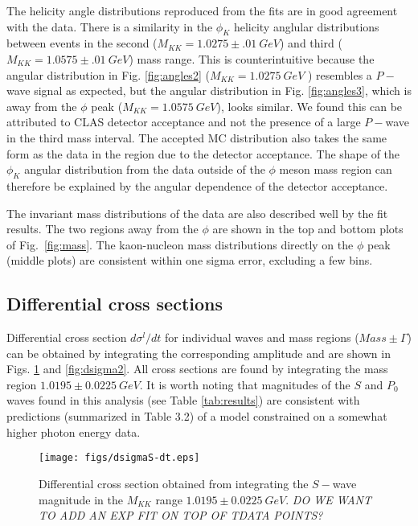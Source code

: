 \documentclass[twocolumn,superscriptaddress,prd]{revtex4}
\begin{document}
The helicity angle distributions reproduced from the fits are in good agreement with the data.
There is a similarity in the $\phi_{K}$ helicity anglular distributions between events in the second ($M_{KK} = 1.0275 \pm .01 \ GeV$) and third ($M_{KK} = 1.0575 \pm .01 \ GeV$) mass range. This is counterintuitive because the angular distribution in Fig. \ref{fig:angles2} ($M_{KK} = 1.0275 \ GeV$ ) resembles
a $P-$wave signal as expected, but the angular distribution in Fig.
\ref{fig:angles3}, which is away from the $\phi$ peak ($M_{KK} = 1.0575 \ GeV$), looks similar. We found this can be attributed to CLAS detector acceptance and not the presence of a large $P-$wave in the third mass interval. The accepted MC distribution also takes the same form as the data in the region due to the detector acceptance. The shape of the $\phi_{K}$ angular distribution from the data outside of the $\phi$ meson mass region can therefore be explained by the angular dependence of the detector acceptance.

The invariant mass distributions of the data are also described well by the fit results. The two regions away from the $\phi$ are shown in the top and bottom plots of  Fig.~\ref{fig:mass}. The kaon-nucleon mass distributions directly on the $\phi$ peak (middle plots) are consistent within one sigma error, excluding a few bins.


\subsection{Differential cross sections} \label{sec:res_sec}
Differential cross section $d\sigma^l /dt$ for individual waves and mass regions ($Mass\pm \Gamma$) can be obtained by integrating the corresponding amplitude and are shown in Figs. \ref{fig:dsigma1} and \ref{fig:dsigma2}.  All cross sections are found by integrating the mass region $1.0195 \pm 0.0225 \ GeV$. 
It is worth noting that magnitudes of the $S$ and $P_0$ waves found in this analysis (see Table \ref{tab:results}) are consistent with predictions (summarized in Table 3.2) of a model constrained on a somewhat higher photon energy data. 

\begin{figure}
\texttt{[image: figs/dsigmaS-dt.eps]}
\caption{Differential cross section obtained from integrating the $S-$wave magnitude in the $M_{KK}$ range $1.0195 \pm 0.0225 \ GeV$. {\it  DO WE WANT TO ADD AN EXP FIT ON TOP OF TDATA POINTS?} }
\label{fig:dsigma1}
\end{figure}
\end{document}

